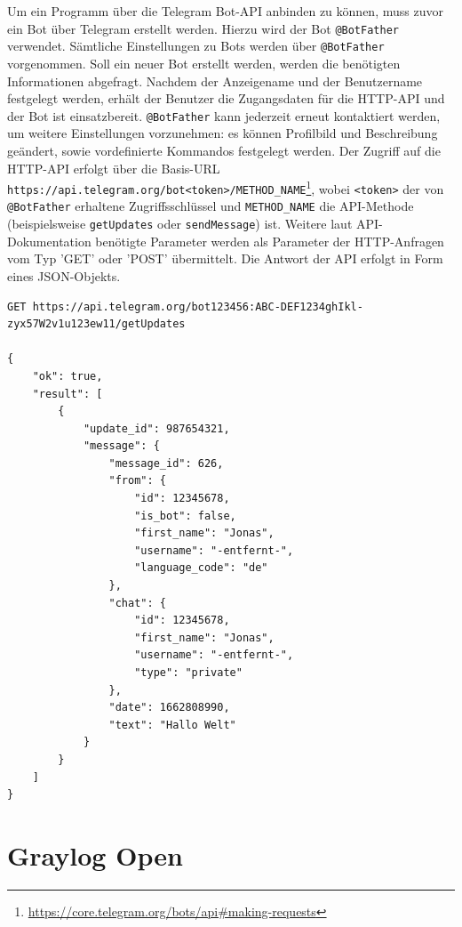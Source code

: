 Um ein Programm über die Telegram Bot-API anbinden zu können, muss zuvor ein Bot über Telegram erstellt werden. Hierzu wird der Bot \lstinline{@BotFather} verwendet. Sämtliche Einstellungen zu Bots werden über \lstinline{@BotFather} vorgenommen. Soll ein neuer Bot erstellt werden, werden die benötigten Informationen abgefragt. Nachdem der Anzeigename und der Benutzername festgelegt werden, erhält der Benutzer die Zugangsdaten für die HTTP-API und der Bot ist einsatzbereit. \lstinline{@BotFather} kann jederzeit erneut kontaktiert werden, um weitere Einstellungen vorzunehmen: es können Profilbild und Beschreibung geändert, sowie vordefinierte Kommandos festgelegt werden. Der Zugriff auf die HTTP-API erfolgt über die Basis-URL \lstinline{https://api.telegram.org/bot<token>/METHOD_NAME}\footnote{\url{https://core.telegram.org/bots/api\#making-requests}}, wobei \lstinline{<token>} der von \lstinline{@BotFather} erhaltene Zugriffsschlüssel und \lstinline{METHOD_NAME} die API-Methode (beispielsweise \lstinline{getUpdates} oder \lstinline{sendMessage}) ist. Weitere laut API-Dokumentation benötigte Parameter werden als Parameter der HTTP-Anfragen vom Typ 'GET' oder 'POST' übermittelt. Die Antwort der API erfolgt in Form eines JSON-Objekts.

\begin{lstlisting}[caption={Beispiel eines Aufrufs der Telegram HTTP-API. Erhalt einer Textnachricht "Hallo Welt".}, label=lst:bsp-telegram-api, numbers=none]
GET https://api.telegram.org/bot123456:ABC-DEF1234ghIkl-zyx57W2v1u123ew11/getUpdates

{
    "ok": true,
    "result": [
        {
            "update_id": 987654321,
            "message": {
                "message_id": 626,
                "from": {
                    "id": 12345678,
                    "is_bot": false,
                    "first_name": "Jonas",
                    "username": "-entfernt-",
                    "language_code": "de"
                },
                "chat": {
                    "id": 12345678,
                    "first_name": "Jonas",
                    "username": "-entfernt-",
                    "type": "private"
                },
                "date": 1662808990,
                "text": "Hallo Welt"
            }
        }
    ]
}
\end{lstlisting}

\section{Graylog Open}

